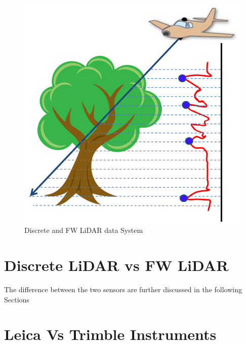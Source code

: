 \documentclass{subfiles}
\begin{document}
         \begin{figure}[!htbp]
         	\centering
         	\includegraphics[width=\textwidth/3*2]{img/LiDAR_DiscretVsFW_fig}
         	\caption[Airborne LiDAR system]{Discrete and FW LiDAR data System \footnotemark}
         	\label{fig:DiscreteFWSystem}
         \end{figure}
                 
        
         

	\section{Discrete LiDAR vs FW LiDAR}
    
   
   	
   	
   	The difference between the two sensors are further discussed in the following Sections

	\section{Leica Vs Trimble Instruments}
	
\end{document}
